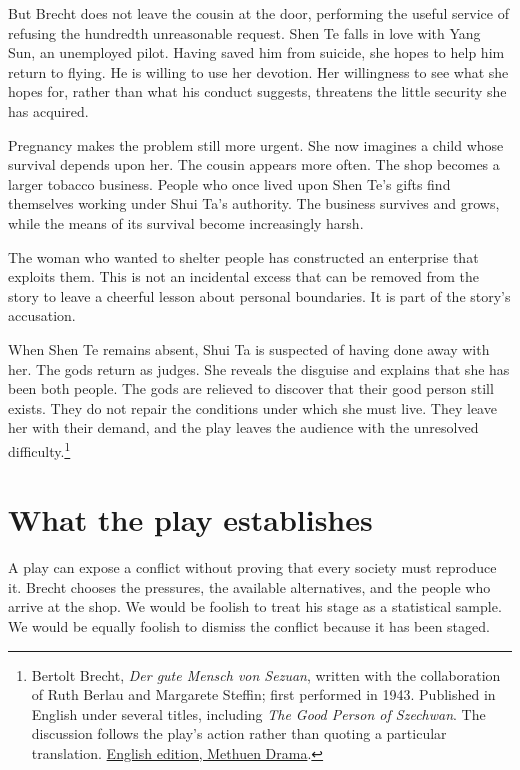 \documentclass[12pt,a4paper]{book}
\begin{document}
But Brecht does not leave the cousin at the door, performing the useful service of refusing the hundredth unreasonable request. Shen Te falls in love with Yang Sun, an unemployed pilot. Having saved him from suicide, she hopes to help him return to flying. He is willing to use her devotion. Her willingness to see what she hopes for, rather than what his conduct suggests, threatens the little security she has acquired.

Pregnancy makes the problem still more urgent. She now imagines a child whose survival depends upon her. The cousin appears more often. The shop becomes a larger tobacco business. People who once lived upon Shen Te's gifts find themselves working under Shui Ta's authority. The business survives and grows, while the means of its survival become increasingly harsh.

The woman who wanted to shelter people has constructed an enterprise that exploits them. This is not an incidental excess that can be removed from the story to leave a cheerful lesson about personal boundaries. It is part of the story's accusation.

When Shen Te remains absent, Shui Ta is suspected of having done away with her. The gods return as judges. She reveals the disguise and explains that she has been both people. The gods are relieved to discover that their good person still exists. They do not repair the conditions under which she must live. They leave her with their demand, and the play leaves the audience with the unresolved difficulty.\footnote{Bertolt Brecht, \emph{Der gute Mensch von Sezuan}, written with the collaboration of Ruth Berlau and Margarete Steffin; first performed in 1943. Published in English under several titles, including \emph{The Good Person of Szechwan}. The discussion follows the play's action rather than quoting a particular translation. \href{https://www.bloomsbury.com/uk/good-person-of-szechwan-9781408100073/}{English edition, Methuen Drama}.}

\section*{What the play establishes}

A play can expose a conflict without proving that every society must reproduce it. Brecht chooses the pressures, the available alternatives, and the people who arrive at the shop. We would be foolish to treat his stage as a statistical sample. We would be equally foolish to dismiss the conflict because it has been staged.
\end{document}
